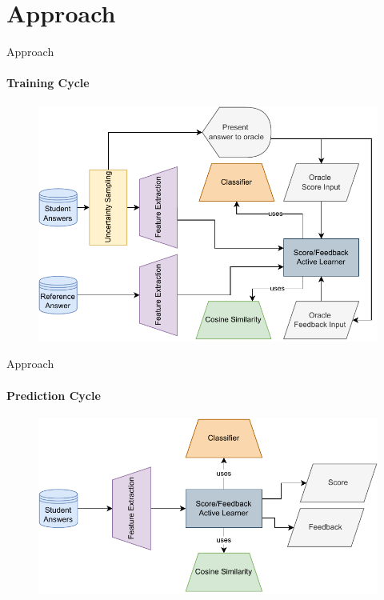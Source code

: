 \documentclass[aspectratio=169]{beamer}
\begin{document}
\section{Approach}
\begin{frame}{Approach}
	\framesubtitle{Training Cycle}
	\begin{figure}
		\centering
		\includegraphics[scale = 0.67]{images/architecture_training.pdf}
		\label{fig:architecture train}
	\end{figure}
\end{frame}
\begin{frame}{Approach}
\framesubtitle{Prediction Cycle}
\begin{figure}
	\centering
	\includegraphics[scale = 0.75]{images/architecture_prediction.pdf}
	\label{fig:architecture predict}
\end{figure}
\end{frame}
\end{document}
